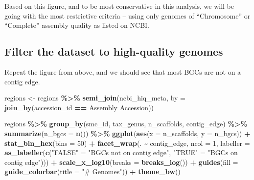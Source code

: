 \documentclass[
]{article}
\newenvironment{Shaded}{\begin{snugshade}}{\end{snugshade}}
\newcommand{\AttributeTok}[1]{\textcolor[rgb]{0.13,0.29,0.53}{#1}}
\newcommand{\DecValTok}[1]{\textcolor[rgb]{0.00,0.00,0.81}{#1}}
\newcommand{\FunctionTok}[1]{\textcolor[rgb]{0.13,0.29,0.53}{\textbf{#1}}}
\newcommand{\NormalTok}[1]{#1}
\newcommand{\OtherTok}[1]{\textcolor[rgb]{0.56,0.35,0.01}{#1}}
\newcommand{\SpecialCharTok}[1]{\textcolor[rgb]{0.81,0.36,0.00}{\textbf{#1}}}
\newcommand{\StringTok}[1]{\textcolor[rgb]{0.31,0.60,0.02}{#1}}
\begin{document}
Based on this figure, and to be most conservative in this analysis, we
will be going with the most restrictive criteria -- using only genomes
of ``Chromosome'' or ``Complete'' assembly quality as listed on NCBI.

\hypertarget{filter-the-dataset-to-high-quality-genomes}{%
\subsection{Filter the dataset to high-quality
genomes}\label{filter-the-dataset-to-high-quality-genomes}}

Repeat the figure from above, and we should see that most BGCs are not
on a contig edge.

\begin{Shaded}
\begin{Highlighting}[]
\NormalTok{regions }\OtherTok{\textless{}{-}}\NormalTok{ regions }\SpecialCharTok{\%\textgreater{}\%}
  \FunctionTok{semi\_join}\NormalTok{(ncbi\_hiq\_meta, }\AttributeTok{by =} \FunctionTok{join\_by}\NormalTok{(accession\_id }\SpecialCharTok{==} \StringTok{\textasciigrave{}}\AttributeTok{Assembly Accession}\StringTok{\textasciigrave{}}\NormalTok{))}

\NormalTok{regions }\SpecialCharTok{\%\textgreater{}\%}
  \FunctionTok{group\_by}\NormalTok{(smc\_id, tax\_genus, n\_scaffolds, contig\_edge) }\SpecialCharTok{\%\textgreater{}\%}
  \FunctionTok{summarize}\NormalTok{(}\AttributeTok{n\_bgcs =} \FunctionTok{n}\NormalTok{()) }\SpecialCharTok{\%\textgreater{}\%}
  \FunctionTok{ggplot}\NormalTok{(}\FunctionTok{aes}\NormalTok{(}\AttributeTok{x =}\NormalTok{ n\_scaffolds, }\AttributeTok{y =}\NormalTok{ n\_bgcs)) }\SpecialCharTok{+}
  \FunctionTok{stat\_bin\_hex}\NormalTok{(}\AttributeTok{bins =} \DecValTok{50}\NormalTok{) }\SpecialCharTok{+}
  \FunctionTok{facet\_wrap}\NormalTok{(. }\SpecialCharTok{\textasciitilde{}}\NormalTok{ contig\_edge, }\AttributeTok{ncol =} \DecValTok{1}\NormalTok{, }\AttributeTok{labeller =} \FunctionTok{as\_labeller}\NormalTok{(}\FunctionTok{c}\NormalTok{(}\StringTok{"FALSE"} \OtherTok{=} \StringTok{"BGCs not on contig edge"}\NormalTok{, }\StringTok{"TRUE"} \OtherTok{=} \StringTok{"BGCs on contig edge"}\NormalTok{))) }\SpecialCharTok{+}
  \FunctionTok{scale\_x\_log10}\NormalTok{(}\AttributeTok{breaks =} \FunctionTok{breaks\_log}\NormalTok{()) }\SpecialCharTok{+}
  \FunctionTok{guides}\NormalTok{(}\AttributeTok{fill =} \FunctionTok{guide\_colorbar}\NormalTok{(}\AttributeTok{title =} \StringTok{"\# Genomes"}\NormalTok{)) }\SpecialCharTok{+}
  \FunctionTok{theme\_bw}\NormalTok{()}
\end{Highlighting}
\end{Shaded}
\end{document}
